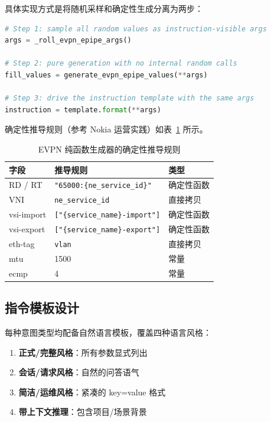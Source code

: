 \documentclass[12pt, a4paper]{article}
\begin{document}
具体实现方式是将随机采样和确定性生成分离为两步：

\begin{lstlisting}[language=Python, caption={纯函数生成器的两步分离}]
# Step 1: sample all random values as instruction-visible args
args = _roll_evpn_epipe_args()

# Step 2: pure generation with no internal random calls
fill_values = generate_evpn_epipe_values(**args)

# Step 3: drive the instruction template with the same args
instruction = template.format(**args)
\end{lstlisting}

\noindent
确定性推导规则（参考 Nokia 运营实践）如表~\ref{tab:deterministic-rules} 所示。

\begin{table}[H]
\centering
\caption{EVPN 纯函数生成器的确定性推导规则}
\label{tab:deterministic-rules}
\small
\begin{tabular}{lll}
\toprule
\textbf{字段} & \textbf{推导规则} & \textbf{类型} \\
\midrule
RD / RT            & \texttt{"65000:\{ne\_service\_id\}"} & 确定性函数 \\
VNI                & \texttt{ne\_service\_id}             & 直接拷贝 \\
vsi-import         & \texttt{["\{service\_name\}-import"]} & 确定性函数 \\
vsi-export         & \texttt{["\{service\_name\}-export"]} & 确定性函数 \\
eth-tag            & \texttt{vlan}                        & 直接拷贝 \\
mtu                & 1500                                  & 常量 \\
ecmp               & 4                                     & 常量 \\
\bottomrule
\end{tabular}
\end{table}

\subsection{指令模板设计}

每种意图类型均配备自然语言模板，覆盖四种语言风格：

\begin{enumerate}
  \item \textbf{正式/完整风格}：所有参数显式列出
  \item \textbf{会话/请求风格}：自然的问答语气
  \item \textbf{简洁/运维风格}：紧凑的 key=value 格式
  \item \textbf{带上下文推理}：包含项目/场景背景
\end{enumerate}
\end{document}
